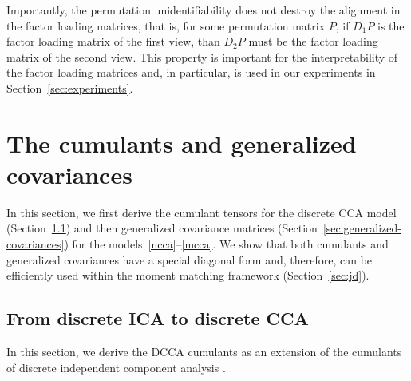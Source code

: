\documentclass{article}
\begin{document}
Importantly, the permutation unidentifiability does not destroy the alignment in the factor loading matrices, that is, for some permutation matrix $P$, if $D_1P$ is the factor loading matrix of the first view, than $D_2P$ must be the factor loading matrix of the second view. 
This property is important for the interpretability of the factor loading matrices and, in particular, is used in our experiments in 
 Section~\ref{sec:experiments}.













%
\section{The cumulants and generalized covariances}
In this section, we first derive the cumulant tensors for the discrete CCA model (Section~\ref{sec:cumulants}) and then generalized covariance matrices (Section~\ref{sec:generalized-covariances}) for the models~\eqref{ncca}--\eqref{mcca}. We show that both cumulants and generalized covariances have a special diagonal form and, therefore, can be efficiently used within the moment matching framework (Section~\ref{sec:jd}).




\subsection{From discrete ICA to discrete CCA}
\label{sec:cumulants}
In this section, we derive the DCCA  cumulants as an extension of the cumulants of discrete independent component analysis \citep[DICA;][]{PodEtAl2015}.
\end{document}
